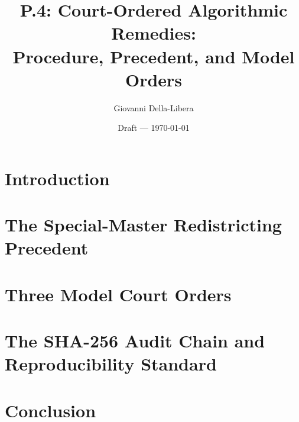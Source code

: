 \documentclass[12pt]{article}
\title{P.4: Court-Ordered Algorithmic Remedies:\\
       Procedure, Precedent, and Model Orders}
\author{Giovanni Della-Libera}
\date{Draft --- \today}
\begin{document}
\maketitle

\begin{abstract}

\end{abstract}

\newpage
\tableofcontents
\newpage

\section{Introduction}


\section{The Special-Master Redistricting Precedent}


\section{Three Model Court Orders}


\section{The SHA-256 Audit Chain and Reproducibility Standard}


\section{Conclusion}




\end{document}
